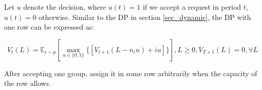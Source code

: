 Let $u$ denote the decision, where $u(t) = 1$ if we accept a request in period $t$, $u(t) =0$ otherwise. Similar to the DP in section \ref{sec_dynamic}, the DP with one row can be expressed as:

$$V_{t}(L) = \mathbb{E}_{i \sim p} [\max_{u \in \{0,1\}} \{ {[V_{t+1}(L-n_i u)+ i u]}\}], L \geq 0, V_{T+1}(L) =0, \forall L$$

After accepting one group, assign it in some row arbitrarily when the capacity of the row allows.













